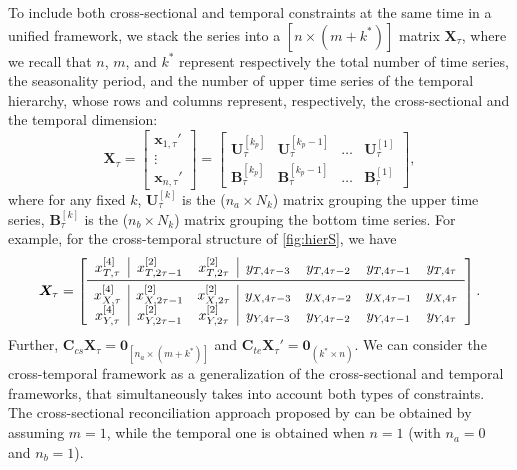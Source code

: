 \documentclass[review, 11pt]{elsarticle}
\newcommand{\xvet}{\bm{x}}
\newcommand{\Bvet}{\bm{B}}
\newcommand{\Cvet}{\bm{C}}
\newcommand{\Uvet}{\bm{U}}
\newcommand{\Xvet}{\bm{X}}
\newcommand{\Zerovet}{\bm{0}}
\theoremstyle{definition}
\begin{document}
To include both cross-sectional and temporal constraints at the same time in a unified framework, we stack the series into a $[n \times (m+k^\ast)]$ matrix $\Xvet_\tau$, 
{\color{blue}where we recall that $n$, $m$, and $k^*$ represent respectively the total number of time series, the seasonality period, and the number of upper time series of the temporal hierarchy,}
whose rows and columns represent, respectively, the cross-sectional and the temporal dimension:
$$
	\Xvet_\tau = \begin{bmatrix}
		\xvet_{1,\tau}' \\[-0.1cm]
		\vdots          \\[-0.2cm]
		\xvet_{n,\tau}'
	\end{bmatrix} = \begin{bmatrix}
	\Uvet_{\tau}^{[k_p]} & \Uvet_{\tau}^{[k_p-1]} & \dots & \Uvet_{\tau}^{[1]}\\[0.25cm]
	\Bvet_{\tau}^{[k_p]} & \Bvet_{\tau}^{[k_p-1]} & \dots & \Bvet_{\tau}^{[1]}
	\end{bmatrix},
$$
where for any fixed $k$,
$\Uvet_{\tau}^{[k]}$ is the ($n_a\times N_k$) matrix grouping the upper time series, $\Bvet_{\tau}^{[k]}$ is the ($n_b\times N_k$) matrix grouping the bottom time series. For example, for the cross-temporal structure of \autoref{fig:hierS}, we have
$$
\Xvet_\tau = \left[\begin{array}{c|cc|cccc}
x^{[4]}_{T,\tau} & x^{[2]}_{T,2\tau-1} & x^{[2]}_{T,2\tau} & y_{T,4\tau-3} & y_{T,4\tau-2} & y_{T,4\tau-1} & y_{T,4\tau}\\
\midrule
x^{[4]}_{X,\tau} & x^{[2]}_{X,2\tau-1} & x^{[2]}_{X,2\tau} & y_{X,4\tau-3} & y_{X,4\tau-2} & y_{X,4\tau-1} & y_{X,4\tau}\\
x^{[4]}_{Y,\tau} & x^{[2]}_{Y,2\tau-1} & x^{[2]}_{Y,2\tau} & y_{Y,4\tau-3} & y_{Y,4\tau-2} & y_{Y,4\tau-1} & y_{Y,4\tau}\\
\end{array}\right].
$$
Further, $\Cvet_{cs}\Xvet_\tau = \Zerovet_{\left[n_a \times (m+k^\ast)\right]}$ and $\Cvet_{te}\Xvet_\tau' = \Zerovet_{(k^\ast \times n)} $. We can consider the cross-temporal framework as a generalization of the cross-sectional and temporal frameworks, that simultaneously takes into account both types of constraints. The cross-sectional reconciliation approach proposed by \cite{hyndman2011} can be obtained by assuming $m = 1$, while the temporal one \citep{athanasopoulos2017} is obtained when $n = 1$ (with $n_a = 0$ and $n_b = 1$).


\end{document}
